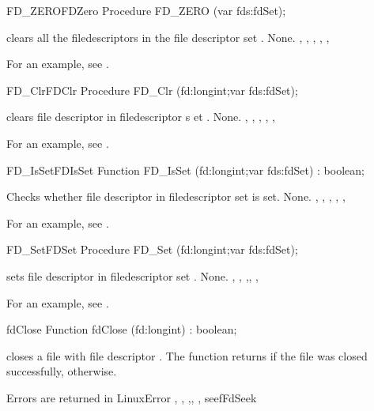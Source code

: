 \begin{procedurel}{FD\_ZERO}{FDZero}
\Declaration
Procedure FD\_ZERO (var fds:fdSet);

\Description
{} clears all the filedescriptors in the file descriptor 
set .
\Errors
None.
\SeeAlso
{}, 
, 
, 
,
, 

\end{procedurel}
For an example, see .
\begin{procedurel}{FD\_Clr}{FDClr}
\Declaration
Procedure FD\_Clr (fd:longint;var fds:fdSet);

\Description
  clears file descriptor  in filedescriptor s
  et .
\Errors
None.
\SeeAlso
{}, 
, 
,
, 
, 
\end{procedurel}
For an example, see .
\begin{functionl}{FD\_IsSet}{FDIsSet}
\Declaration
Function FD\_IsSet (fd:longint;var fds:fdSet) : boolean;

\Description
{} Checks whether file descriptor  in filedescriptor set 
is set.
\Errors
None.
\SeeAlso
{}, , ,
, 
,
\end{functionl}
For an example, see .
\begin{procedurel}{FD\_Set}{FDSet}
\Declaration
Procedure FD\_Set (fd:longint;var fds:fdSet);

\Description
{} sets file descriptor  in filedescriptor set .
\Errors
None.
\SeeAlso
{}, , ,, 
, 
\end{procedurel}
For an example, see .
\begin{function}{fdClose}
\Declaration
Function fdClose (fd:longint) : boolean;

\Description

 closes a file with file descriptor . The function
returns  if the file was closed successfully, 
otherwise. 

\Errors
Errors are returned in LinuxError
\SeeAlso
{}, , ,,
, seef{FdSeek}
\end{function}
